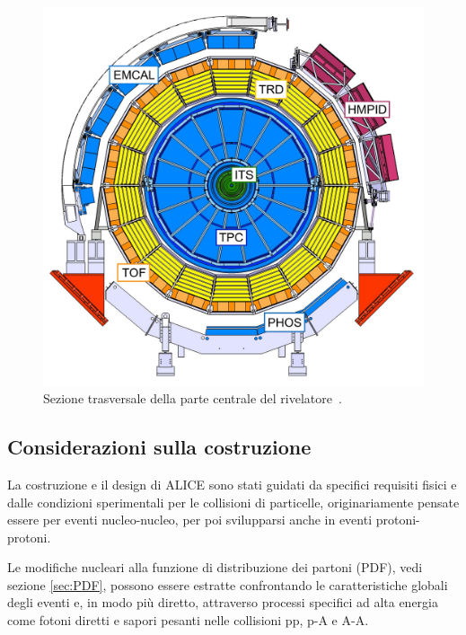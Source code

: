 \newpage

    \begin{figure}[t]
        \centering
        \includegraphics[width=0.6\linewidth]{res/fig/2-chapter/3-ALICE-detector-center.jpg}
        \caption{Sezione trasversale della parte centrale del rivelatore~\cite{Gagliardi_2019}.}
        \label{fig:2-3-ALICE-detector-center}
    \end{figure}

    \subsection{Considerazioni sulla costruzione}
        La costruzione e il design di ALICE sono stati guidati da specifici requisiti fisici e dalle condizioni sperimentali per le collisioni di particelle, originariamente pensate essere per eventi nucleo-nucleo, per poi svilupparsi anche in eventi protoni-protoni.

        Le modifiche nucleari alla funzione di distribuzione dei partoni (PDF), vedi sezione \ref{sec:PDF}, possono essere estratte confrontando le caratteristiche globali degli eventi e, in modo più diretto, attraverso processi specifici ad alta energia come fotoni diretti e sapori pesanti nelle collisioni pp, p-A e A-A.

